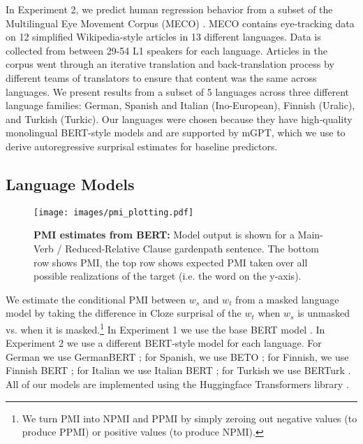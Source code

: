 \documentclass[12pt]{article}
\newcommand{\targetindex}{t}
\newcommand{\sourceindex}{s}
\newcommand{\target}{$w_{\targetindex}$\xspace}
\newcommand{\source}{$w_{\sourceindex}$\xspace}
\begin{document}
In Experiment 2, we predict human regression behavior from a subset of the Multilingual Eye Movement Corpus (MECO) \citep{siegelman2022expanding}. MECO contains eye-tracking data on 12 simplified Wikipedia-style articles in 13 different languages. Data is collected from between 29-54 L1 speakers for each language. Articles in the corpus went through an iterative translation and back-translation process by different teams of translators to ensure that content was the same across languages. We present results from a subset of 5 languages across three different language families: German, Spanish and Italian (Ino-European), Finnish (Uralic), and Turkish (Turkic). Our languages were chosen because they have high-quality monolingual BERT-style models and are supported by mGPT, which we use to derive autoregressive surprisal estimates for baseline predictors.

\subsection{Language Models}

\begin{figure*}[t]
    \centering
    \begin{minipage}{0.95\textwidth}
    \centering
    \small
    \texttt{[image: images/pmi\_plotting.pdf]}
    \vspace{-0.8cm}
    \caption{ \textbf{PMI estimates from BERT:} Model output is shown for a Main-Verb / Reduced-Relative Clause gardenpath sentence. The bottom row shows PMI, the top row shows expected PMI taken over all possible realizations of the target (i.e. the word on the y-axis). }
    \label{fig:pmi-example}
    \end{minipage}
\end{figure*}

We estimate the conditional PMI between \source and \target from a masked language model by taking the difference in Cloze surprisal of the \target when  \source is unmasked vs. when it is masked.\footnote{We turn PMI into NPMI and PPMI by simply zeroing out negative values (to produce PPMI) or positive values (to produce NPMI).} In Experiment 1 we use the base BERT model \cite{devlin2019bert}. In Experiment 2 we use a different BERT-style model for each language. For German we use GermanBERT \citep{deepset2019german}; for Spanish, we use BETO \citep{CaneteCFP2020}; for Finnish, we use Finnish BERT \citep{virtanen2019multilingual}; for Italian we use Italian BERT \citep{stefan_schweter_2020_4263142}; for Turkish we use BERTurk \citep{stefan_schweter_2020_3770924}. All of our models are implemented using the Huggingface Transformers library \citep{wolf2019huggingface}.
\end{document}
